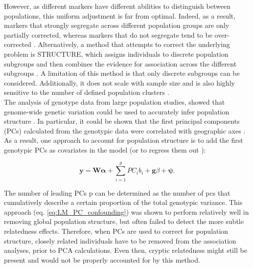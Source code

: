 \newpage

However, as different markers have different abilities to distinguish between populations, this uniform adjustment is far from optimal. 
Indeed, as a result, markers that strongly segregate across different population groups are only partially corrected, whereas markers that do not segregate tend to be over-corrected \cite{marchini2004effects, price2006principal}.
Alternatively, a method that attempts to correct the underlying problem is STRUCTURE, which assigns individuals to discrete population subgroups and then combines the evidence for association across the different subgroups \cite{pritchard2000inference}. 
A limitation of this method is that only discrete subgroups can be considered. 
Additionally, it does not scale with sample size and is also highly sensitive to the number of defined population clusters \cite{price2006principal}.\\

The analysis of genotype data from large population studies, showed that genome-wide genetic variation could be used to
accurately infer population structure 
\cite{li2008worldwide, tian2008analysis, price2008discerning}.
In particular, it could be shown that the first principal components (PCs) calculated from the genotypic data were correlated with geographic axes \cite{novembre2008interpreting}.
As a result, one approach to account for population structure is to add the first genotypic PCs as covariates in the model (or to regress them out \cite{price2006principal}): 

\begin{equation}\label{eq:LM_PC_confounding}
    \mathbf{y} =  \mathbf{W}\boldsymbol{\alpha} + \sum_{i=1}^{p} PC_i b_i + \mathbf{g}\beta + \boldsymbol{\psi}. 
\end{equation}

The number of leading PCs p can be determined as the number of \gls{pc}s that cumulatively describe a certain proportion of the total genotypic variance.
This approach (eq. \eqref{eq:LM_PC_confounding}) was shown to perform relatively well in removing global population structure, but often failed to detect the more subtle relatedness effects.
Therefore, when PCs are used to correct for population structure, closely related individuals have to be removed from the association analyses, prior to PCA calculations.
Even then, cryptic relatedness might still be present and would not be properly accounted for by this method. 

